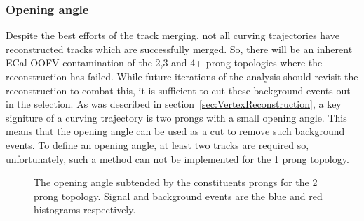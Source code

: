\subsubsection{Opening angle}
\label{subsubsec:OpeningAngle}
Despite the best efforts of the track merging, not all curving trajectories have reconstructed tracks which are successfully merged.  So, there will be an inherent ECal OOFV contamination of the 2,3 and 4+ prong topologies where the reconstruction has failed.  While future iterations of the analysis should revisit the reconstruction to combat this, it is sufficient to cut these background events out in the selection.  As was described in section~\ref{sec:VertexReconstruction}, a key signiture of a curving trajectory is two prongs with a small opening angle.  This means that the opening angle can be used as a cut to remove such background events.  To define an opening angle, at least two tracks are required so, unfortunately, such a method can not be implemented for the 1 prong topology.
\newline
\newline
\begin{figure}%
  \centering
  \caption{The opening angle subtended by the constituents prongs for the 2 prong topology.  Signal and background events are the blue and red histograms respectively.}
  \label{fig:Sel2OpeningAngle}
\end{figure}
